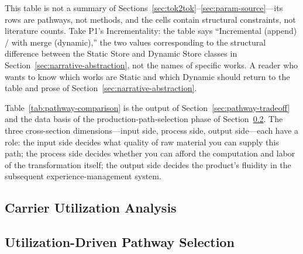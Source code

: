 This table is not a summary of Sections~\ref{sec:tok2tok}--\ref{sec:param-source}---its rows are pathways, not methods, and the cells contain structural constraints, not literature counts. Take P1's Incrementality: the table says ``Incremental (append) / with merge (dynamic),'' the two values corresponding to the structural difference between the Static Store and Dynamic Store classes in Section~\ref{sec:narrative-abstraction}, not the names of specific works. A reader who wants to know which works are Static and which Dynamic should return to the table and prose of Section~\ref{sec:narrative-abstraction}.

Table~\ref{tab:pathway-comparison} is the output of Section~\ref{sec:pathway-tradeoff} and the data basis of the production-path-selection phase of Section~\ref{sec:pathway-selection}. The three cross-section dimensions---input side, process side, output side---each have a role: the input side decides what quality of raw material you can supply this path; the process side decides whether you can afford the computation and labor of the transformation itself; the output side decides the product's fluidity in the subsequent experience-management system.

\subsection{Carrier Utilization Analysis}
\label{sec:utilization-analysis}


\subsection{Utilization-Driven Pathway Selection}
\label{sec:pathway-selection}

